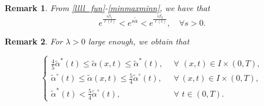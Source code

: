 \documentclass[11pt,a4paper]{amsart}
\numberwithin{equation}{section}
\newtheorem{remark}{Remark}[section]
\begin{document}
\begin{remark}
	From \eqref{llll_fun}-\eqref{minmaxminn}, we have that
\begin{equation}\label{pesos-0}
	 e^\frac{s\beta_1}{\ell(t)}<e^{s\tilde{\alpha}}<e^\frac{s\beta_2}{\ell(t)},\quad \forall s>0.
	 \end{equation}
\end{remark}


\begin{remark}
For  $\lambda>0$  large enough,  we obtain that

\begin{equation} \label{pesos-1}
    	\left\{\begin{array}{ll}
    \displaystyle 	\frac{4}{5}\tilde{\alpha}^*(t)\leq \tilde{\alpha}(x,t)\leq \tilde{\alpha}^*(t),\,\,\, &\forall\,\, (x,t)\in I\times(0,T),\\
    \displaystyle 	\tilde{\alpha}^{\circ}(t)\leq \tilde{\alpha}(x,t)\leq \frac{5}{4}\tilde{\alpha}^{\circ}(t),\,\,& \forall\, (x,t)\in I\times(0,T),\\
    \displaystyle\tilde{\alpha}^*(t)<\frac{5}{4}\tilde{\alpha}^{\circ}(t),\,\,&\forall\,\, t\in (0,T).
    \end{array}\right.
\end{equation}

\end{remark}
\end{document}
